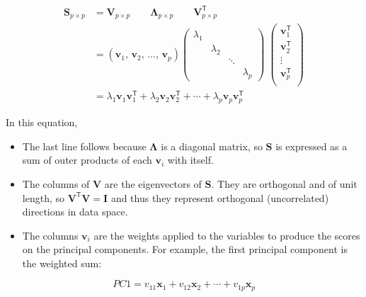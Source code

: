 \documentclass[
  letterpaper,
  10pt,
  krantz2]{krantz}
\begin{document}
{\begin{align*}
\mathbf{S}_{p \times p} & = \mathbf{V}_{p \times p} \quad\quad \mathbf{\Lambda}_{p \times p} \quad\quad \mathbf{V}_{p \times p}^\textsf{T} \\
           & = \left( \mathbf{v}_1, \, \mathbf{v}_2, \,\dots, \, \mathbf{v}_p \right)
           \begin{pmatrix}
             \lambda_1 &  &  & \\ 
             & \lambda_2  &   & \\ 
             &  & \ddots & \\ 
             &  &  & \lambda_p 
            \end{pmatrix}
            \;
            \begin{pmatrix}
            \mathbf{v}_1^\textsf{T}\\ 
            \mathbf{v}_2^\textsf{T}\\ 
            \vdots\\ 
            \mathbf{v}_p^\textsf{T}\\ 
            \end{pmatrix}
           \\
           & = \lambda_1 \mathbf{v}_1 \mathbf{v}_1^\textsf{T} + \lambda_2 \mathbf{v}_2 \mathbf{v}_2^\textsf{T} + \cdots + \lambda_p \mathbf{v}_p \mathbf{v}_p^\textsf{T}
\end{align*}

In this equation,

\begin{itemize}
\item
  The last line follows because \(\mathbf{\Lambda}\) is a diagonal
  matrix, so \(\mathbf{S}\) is expressed as a sum of outer products of
  each \(\mathbf{v}_i\) with itself.\\
\item
  The columns of \(\mathbf{V}\) are the eigenvectors of \(\mathbf{S}\).
  They are orthogonal and of unit length, so
  \(\mathbf{V}^\textsf{T} \mathbf{V} = \mathbf{I}\) and thus they
  represent orthogonal (uncorrelated) directions in data space.
\item
  The columns \(\mathbf{v}_i\) are the weights applied to the variables
  to produce the scores on the principal components. For example, the
  first principal component is the weighted sum:
\end{itemize}

\[
PC1 = v_{11} \mathbf{x}_1 + v_{12} \mathbf{x}_2 + \cdots + v_{1p} \mathbf{x}_p
\]

}
\end{document}
